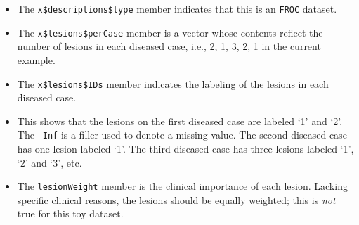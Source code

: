 \documentclass[
]{book}
\newenvironment{Shaded}{\begin{snugshade}}{\end{snugshade}}
\newcommand{\CommentTok}[1]{\textcolor[rgb]{0.56,0.35,0.01}{\textit{#1}}}
\newcommand{\NormalTok}[1]{#1}
\newcommand{\SpecialCharTok}[1]{\textcolor[rgb]{0.00,0.00,0.00}{#1}}
\providecommand{\tightlist}{%
  \setlength{\itemsep}{0pt}\setlength{\parskip}{0pt}}
\begin{document}
\begin{itemize}
\tightlist
\item
  The \texttt{x\$descriptions\$type} member indicates that this is an \texttt{FROC} dataset.
\item
  The \texttt{x\$lesions\$perCase} member is a vector whose contents reflect the number of lesions in each diseased case, i.e., 2, 1, 3, 2, 1 in the current example.
\item
  The \texttt{x\$lesions\$IDs} member indicates the labeling of the lesions in each diseased case.
\end{itemize}

\begin{Shaded}
\end{Shaded}

\begin{itemize}
\tightlist
\item
  This shows that the lesions on the first diseased case are labeled `1' and `2'. The \texttt{-Inf} is a filler used to denote a missing value. The second diseased case has one lesion labeled `1'. The third diseased case has three lesions labeled `1', `2' and `3', etc.
\item
  The \texttt{lesionWeight} member is the clinical importance of each lesion. Lacking specific clinical reasons, the lesions should be equally weighted; this is \emph{not} true for this toy dataset.
\end{itemize}

\begin{Shaded}
\end{Shaded}
\end{document}

